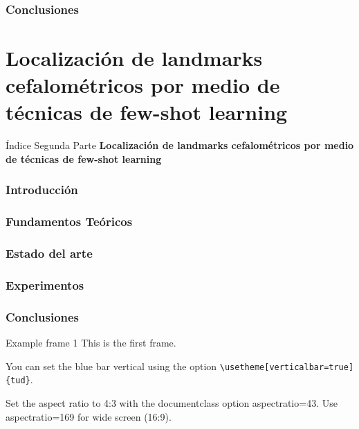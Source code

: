 \documentclass[aspectratio=43]{beamer}
\begin{document}
\section{Conclusiones}

\part{Localización de landmarks cefalométricos por medio de técnicas de few-shot learning}

\begin{frame}{Índice Segunda Parte}
  \textcolor{tudCyan}{\textbf{Localización de landmarks cefalométricos por medio de técnicas de few-shot learning}}
  \medskip
  \tableofcontents[part=2]
\end{frame}


\section{Introducción}

\section{Fundamentos Teóricos}

\section{Estado del arte}

\section{Experimentos}

\section{Conclusiones}


\begin{frame}[fragile]{Example frame 1} %
This is the first frame.

You can set the blue bar vertical using the option \verb|\usetheme[verticalbar=true]{tud}|.

Set the aspect ratio to 4:3 with the
documentclass option aspectratio=43. Use aspectratio=169 for wide screen (16:9).
\end{frame}
\end{document}
